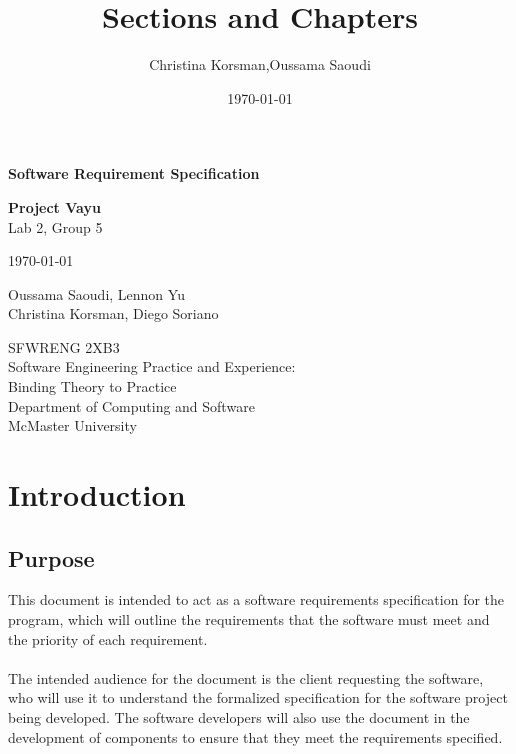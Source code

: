 \documentclass{article}
\title{Sections and Chapters}
\author{Christina Korsman,Oussama Saoudi}
\date{\today}
\begin{document}
\begin{titlepage}
    \begin{center}
        \vspace*{1cm}
            
        \Huge
        \textbf{Software Requirement Specification}

        \LARGE
        \vspace{0.5cm}
        \textbf{Project Vayu}\\
        \vspace{0.2cm}
        Lab 2, Group 5

        \vspace{0.2cm}
        \today
            
        \vspace{1.5cm}
            
        \Large
        Oussama Saoudi, Lennon Yu\\
        Christina Korsman, Diego Soriano

        \vfill
            
        \vspace{0.8cm}
                        
        \large
        SFWRENG 2XB3\\
        Software Engineering Practice and Experience:\\
        Binding Theory to Practice\\
        Department of Computing and Software\\
        McMaster University            
    \end{center}
\end{titlepage}
  
\tableofcontents
\pagebreak
 
\section{Introduction}
\subsection{Purpose}
    This document is intended to act as a software requirements specification 
    for the program, which will outline the requirements that the software 
    must meet and the priority of each requirement. \\\\
The intended audience for the document is the client requesting the software, 
who will use it to understand the formalized specification for the software 
project being developed. The software developers will also use the document 
in the development of components to ensure that they meet the requirements specified.
 
\end{document}

